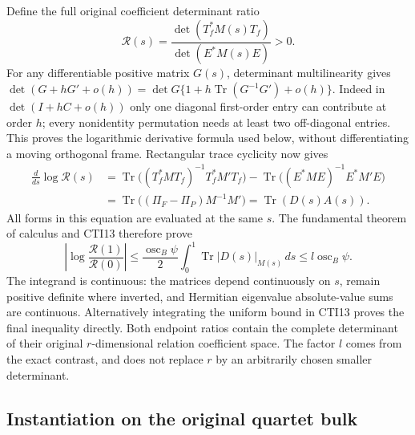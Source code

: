 Define the full original coefficient determinant ratio
\[
 \mathcal R(s)=
 \frac{\det(T_f^*M(s)T_f)}{\det(E^*M(s)E)}>0.
 \tag{CTI14}
\]
For any differentiable positive matrix $G(s)$, determinant
multilinearity gives
$\det(G+hG'+o(h))=\det G\{1+h\operatorname{Tr}(G^{-1}G')+o(h)\}$.
Indeed in $\det(I+hC+o(h))$ only one diagonal first-order entry
can contribute at order $h$; every nonidentity permutation needs
at least two off-diagonal entries. This proves the logarithmic
derivative formula used below, without differentiating a
moving orthogonal frame. Rectangular trace cyclicity now gives
\[
 \begin{aligned}
 \frac{d}{ds}\log\mathcal R(s)
 &=\operatorname{Tr}\bigl((T_f^*MT_f)^{-1}T_f^*M'T_f\bigr)
   -\operatorname{Tr}\bigl((E^*ME)^{-1}E^*M'E\bigr)\\
 &=\operatorname{Tr}\bigl((\Pi_F-\Pi_P)M^{-1}M'\bigr)
 =\operatorname{Tr}(D(s)A(s)).
 \end{aligned}
 \tag{CTI15}
\]
All forms in this equation are evaluated at the same $s$.
The fundamental theorem of calculus and CTI13 therefore prove
\[
 \left|\log\frac{\mathcal R(1)}{\mathcal R(0)}\right|
 \leq\frac{\operatorname{osc}_B\psi}{2}
       \int_0^1\operatorname{Tr}|D(s)|_{M(s)}\,ds
 \leq l\operatorname{osc}_B\psi.
 \tag{CTI16}
\]
The integrand is continuous: the matrices depend continuously
on $s$, remain positive definite where inverted, and Hermitian
eigenvalue absolute-value sums are continuous. Alternatively
integrating the uniform bound in CTI13 proves the final inequality
directly. Both endpoint ratios contain the complete determinant
of their original $r$-dimensional relation coefficient space.
The factor $l$ comes from the exact contrast, and does not replace
$r$ by an arbitrarily chosen smaller determinant.

\subsection{Instantiation on the original quartet bulk}

